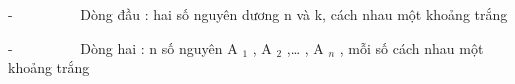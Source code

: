 -          Dòng đầu : hai số nguyên dương n và k, cách nhau một khoảng trắng  

   -          Dòng hai : n số nguyên A   $_    1   $   , A   $_    2   $   ,… , A   $_    n   $   , mỗi số cách nhau một khoảng trắng
